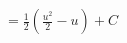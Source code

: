 \documentclass[preview]{standalone}
\begin{document}
\begin{align*}
= \frac{1}{2} \left( \frac{u^2}{2} - u \right) + C
\end{align*}
\end{document}
